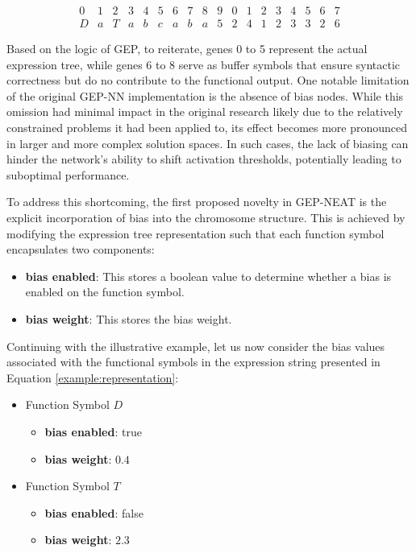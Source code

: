 \begin{ceqn}
	\begin{equation}\label{example:representation}
		\begin{array}{cccccccccccccccccc}
			0 & 1 & 2 & 3 & 4 & 5 & 6 & 7 & 8 & 9 & 0 & 1 & 2 & 3 & 4 & 5 & 6 & 7 \\
			D & a & T & a & b & c & a & b & a & 5 & 2 & 4 & 1 & 2 & 3 & 3 & 2 & 6
		\end{array}
	\end{equation}
\end{ceqn}

\noindent Based on the logic of GEP, to reiterate, genes 0 to 5 represent the actual expression tree, while genes 6 to 8 serve as buffer symbols that ensure syntactic correctness but do no contribute to the functional output. One notable limitation of the original GEP-NN implementation is the absence of bias nodes. While this omission had minimal impact in the original research likely due to the relatively constrained problems it had been applied to, its effect becomes more pronounced in larger and more complex solution spaces. In such cases, the lack of biasing can hinder the network's ability to shift activation thresholds, potentially leading to suboptimal performance. 

\parbreak\noindent To address this shortcoming, the first proposed novelty in GEP-NEAT is the explicit incorporation of bias into the chromosome structure. This is achieved by modifying the expression tree representation such that each function symbol encapsulates two components:
\begin{itemize}
    \item \textbf{bias enabled}: This stores a boolean value to determine whether a bias is enabled on the function symbol.
    \item \textbf{bias weight}: This stores the bias weight.
\end{itemize}

\parbreak\noindent Continuing with the illustrative example, let us now consider the bias values associated with the functional symbols in the expression string presented in Equation \ref{example:representation}:
\begin{itemize}
    \item Function Symbol \textbf{$D$}
    \begin{itemize}
        \item \textbf{bias enabled}: true
        \item \textbf{bias weight}: $0.4$
    \end{itemize}

    \item Function Symbol \textbf{$T$}
    \begin{itemize}
        \item \textbf{bias enabled}: false
        \item \textbf{bias weight}: $2.3$
    \end{itemize}
\end{itemize}

